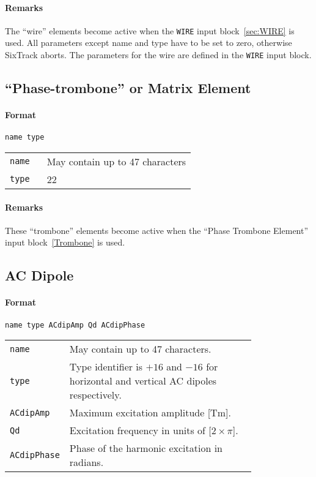 \paragraph{Remarks}
The ``wire'' elements become active when the \texttt{WIRE} input block~\ref{sec:WIRE} is used.
All parameters except name and type have to be set to zero, otherwise SixTrack aborts.
The parameters for the wire are defined in the \texttt{WIRE} input block.

\subsection{``Phase-trombone'' or Matrix Element} \label{PT}

\paragraph{Format} \texttt{name type}

\bigskip
\begin{tabular}{@{}lp{0.8\linewidth}}
    \texttt{name} & May contain up to 47 characters \\
    \texttt{type} & 22
\end{tabular}

\paragraph{Remarks}
These ``trombone'' elements become active when the ``Phase Trombone Element'' input block~\ref{Trombone} is used.

\subsection{AC Dipole} \label{ACDIP}

\paragraph{Format} \texttt{name type ACdipAmp Qd ACdipPhase}

\bigskip
\begin{tabular}{@{}lp{0.8\linewidth}}
    \texttt{name} & May contain up to 47 characters. \\
    \texttt{type} & Type identifier is $+16$ and $-16$ for horizontal and vertical AC dipoles respectively. \\
    \texttt{ACdipAmp} & Maximum excitation amplitude [Tm]. \\
    \texttt{Qd}   & Excitation frequency in units of [$2 \times \pi$]. \\
    \texttt{ACdipPhase} & Phase of the harmonic excitation in radians.
\end{tabular}

